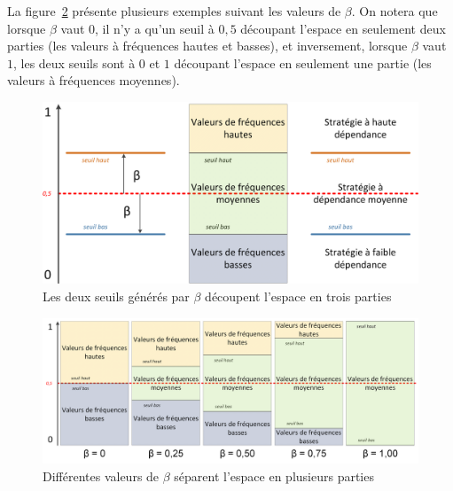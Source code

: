 La figure~\ref{figure:2-S2-Strategies-Exemple-Trois-Parties} présente plusieurs exemples suivant les valeurs de $ \beta $.
On notera que lorsque $ \beta $ vaut $ 0 $, il n'y a qu'un seuil à $ 0,5 $ découpant l'espace en seulement deux parties (les valeurs à fréquences hautes et basses), et inversement, lorsque $ \beta $ vaut $ 1 $, les deux seuils sont à $ 0 $ et $ 1 $ découpant l'espace en seulement une partie (les valeurs à fréquences moyennes).

\begin{figure}[ht]
\centering
\centerline{
\includegraphics[scale=0.65]{2-Etat-de-l'Art/images/ACF/Strategies/explication_strategies_seuils_beta.png}
}
\caption{Les deux seuils générés par $ \beta $ découpent l'espace en trois parties}
\label{figure:2-S2-Strategies-Exemple-Seuils}
\end{figure}

\begin{figure}[ht]
\centering
\centerline{  %
\includegraphics[scale=0.6]{2-Etat-de-l'Art/images/ACF/Strategies/explication_strategies_trois_parties.png}
}
\caption{Différentes valeurs de $ \beta $ séparent l'espace en plusieurs parties}
\label{figure:2-S2-Strategies-Exemple-Trois-Parties}
\end{figure}

